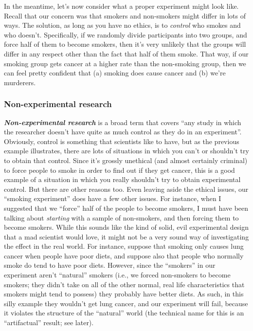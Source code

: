 \documentclass[
]{book}
\begin{document}
In the meantime, let's now consider what a proper experiment might look like. Recall that our concern was that smokers and non-smokers might differ in lots of ways. The solution, as long as you have no ethics, is to \emph{control} who smokes and who doesn't. Specifically, if we randomly divide participants into two groups, and force half of them to become smokers, then it's very unlikely that the groups will differ in any respect other than the fact that half of them smoke. That way, if our smoking group gets cancer at a higher rate than the non-smoking group, then we can feel pretty confident that (a) smoking does cause cancer and (b) we're murderers.

\hypertarget{non-experimental-research}{%
\subsubsection{Non-experimental research}\label{non-experimental-research}}

\textbf{\emph{Non-experimental research}} is a broad term that covers ``any study in which the researcher doesn't have quite as much control as they do in an experiment''. Obviously, control is something that scientists like to have, but as the previous example illustrates, there are lots of situations in which you can't or shouldn't try to obtain that control. Since it's grossly unethical (and almost certainly criminal) to force people to smoke in order to find out if they get cancer, this is a good example of a situation in which you really shouldn't try to obtain experimental control. But there are other reasons too. Even leaving aside the ethical issues, our ``smoking experiment'' does have a few other issues. For instance, when I suggested that we ``force'' half of the people to become smokers, I must have been talking about \emph{starting} with a sample of non-smokers, and then forcing them to become smokers. While this sounds like the kind of solid, evil experimental design that a mad scientist would love, it might not be a very sound way of investigating the effect in the real world. For instance, suppose that smoking only causes lung cancer when people have poor diets, and suppose also that people who normally smoke do tend to have poor diets. However, since the ``smokers'' in our experiment aren't ``natural'' smokers (i.e., we forced non-smokers to become smokers; they didn't take on all of the other normal, real life characteristics that smokers might tend to possess) they probably have better diets. As such, in this silly example they wouldn't get lung cancer, and our experiment will fail, because it violates the structure of the ``natural'' world (the technical name for this is an ``artifactual'' result; see later).
\end{document}
